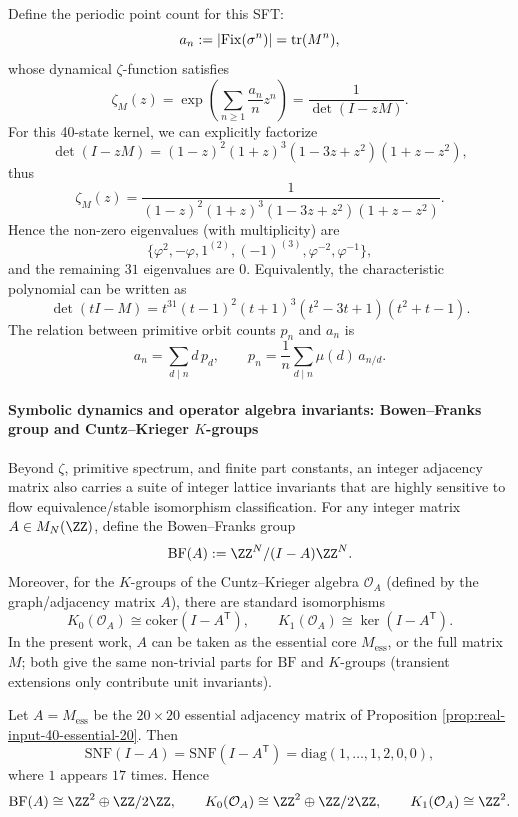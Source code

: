 

Define the periodic point count for this SFT:
\[
a_n:=|{\rm Fix}(\sigma^n)|=\operatorname{tr}(M^n),
\]
whose dynamical $\zeta$-function satisfies
\[
\zeta_M(z)=\exp\!\left(\sum_{n\ge 1}\frac{a_n}{n}z^n\right)=\frac{1}{\det(I-zM)}.
\]
For this 40-state kernel, we can explicitly factorize
\[
\det(I-zM)=(1-z)^2(1+z)^3(1-3z+z^2)(1+z-z^2),
\]
thus
\[
\zeta_M(z)=\frac{1}{(1-z)^2(1+z)^3(1-3z+z^2)(1+z-z^2)}.
\]
Hence the non-zero eigenvalues (with multiplicity) are
\[
\{\varphi^2,-\varphi,1^{(2)},(-1)^{(3)},\varphi^{-2},\varphi^{-1}\},
\]
and the remaining $31$ eigenvalues are $0$.
Equivalently, the characteristic polynomial can be written as
\[
\det(tI-M)=t^{31}(t-1)^2(t+1)^3(t^2-3t+1)(t^2+t-1).
\]
The relation between primitive orbit counts $p_n$ and $a_n$ is
\[
a_n=\sum_{d\mid n} d\,p_d,\qquad
p_n=\frac{1}{n}\sum_{d\mid n}\mu(d)\,a_{n/d}.
\]

\paragraph{Symbolic dynamics and operator algebra invariants: Bowen--Franks group and Cuntz--Krieger \texorpdfstring{$K$}{K}-groups}
Beyond $\zeta$, primitive spectrum, and finite part constants, an integer adjacency matrix also carries a suite of integer lattice invariants that are highly sensitive to flow equivalence/stable isomorphism classification.
For any integer matrix $A\in M_N(\ZZ)$, define the Bowen--Franks group
\[
\mathrm{BF}(A):=\ZZ^N/(I-A)\ZZ^N.
\]
Moreover, for the $K$-groups of the Cuntz--Krieger algebra $\mathcal O_A$ (defined by the graph/adjacency matrix $A$), there are standard isomorphisms
\[
K_0(\mathcal O_A)\cong \mathrm{coker}(I-A^\mathsf T),\qquad
K_1(\mathcal O_A)\cong \ker(I-A^\mathsf T).
\]
In the present work, $A$ can be taken as the essential core $M_{\mathrm{ess}}$, or the full matrix $M$; both give the same non-trivial parts for $\mathrm{BF}$ and $K$-groups (transient extensions only contribute unit invariants).

\begin{proposition}\label{prop:real-input-40-bf-ktheory}
Let $A=M_{\mathrm{ess}}$ be the $20\times 20$ essential adjacency matrix of Proposition \ref{prop:real-input-40-essential-20}. Then
\[
\mathrm{SNF}(I-A)=\mathrm{SNF}(I-A^\mathsf T)=\mathrm{diag}(1,\dots,1,2,0,0),
\]
where $1$ appears $17$ times. Hence
\[
\mathrm{BF}(A)\cong \ZZ^2\oplus \ZZ/2\ZZ,
\qquad
K_0(\mathcal O_A)\cong \ZZ^2\oplus \ZZ/2\ZZ,
\qquad
K_1(\mathcal O_A)\cong \ZZ^2.
\]
\end{proposition}

